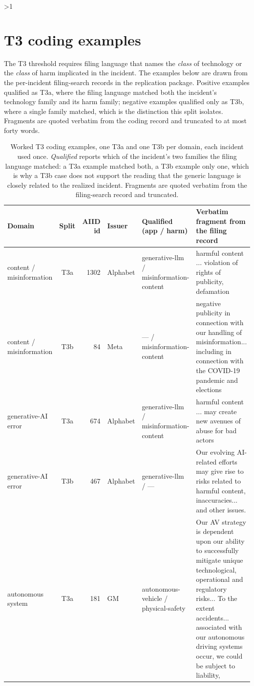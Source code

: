 \documentclass[11pt]{article}
\let\oldsection\section
\newcounter{supsec}
\renewcommand{\section}[1]{\stepcounter{supsec}\ifnum\value{supsec}>1\clearpage\fi\oldsection*{#1}}
\begin{document}
\section{T3 coding examples}
The T3 threshold requires filing language that names the \emph{class} of technology or the
\emph{class} of harm implicated in the incident. The examples below are drawn from the per-incident
filing-search records in the replication package. Positive examples qualified as T3a, where the
filing language matched both the incident's technology family and its harm family; negative examples
qualified only as T3b, where a single family matched, which is the distinction this split isolates.
Fragments are quoted verbatim from the coding record and truncated to at most forty words.

\begin{table}[H]
\caption{Worked T3 coding examples, one T3a and one T3b per domain, each incident used once. \emph{Qualified} reports which of the incident's two families the filing language matched: a T3a example matched both, a T3b example only one, which is why a T3b case does not support the reading that the generic language is closely related to the realized incident. Fragments are quoted verbatim from the filing-search record and truncated.}
\centering\scriptsize
\begin{center}
\begin{tabular}{@{}p{1.9cm}cr p{1.7cm} p{2.5cm} p{4.6cm}@{}}
\toprule
Domain & Split & AIID id & Issuer & Qualified (app / harm) & Verbatim fragment from the filing record \\ \midrule
content / misinformation & T3a & 1302 & Alphabet & generative-llm / misinformation-content & harmful content ... violation of rights of publicity, defamation \\
content / misinformation & T3b & 84 & Meta & --- / misinformation-content & negative publicity in connection with our handling of misinformation... including in connection with the COVID-19 pandemic and elections \\
generative-AI error & T3a & 674 & Alphabet & generative-llm / misinformation-content & harmful content ... may create new avenues of abuse for bad actors \\
generative-AI error & T3b & 467 & Alphabet & generative-llm / --- & Our evolving AI-related efforts may give rise to risks related to harmful content, inaccuracies... and other issues. \\
autonomous system & T3a & 181 & GM & autonomous-vehicle / physical-safety & Our AV strategy is dependent upon our ability to successfully mitigate unique technological, operational and regulatory risks... To the extent accidents... associated with our autonomous driving systems occur, we could be subject to liability, \\

\end{tabular}
\end{center}
\end{table}
\end{document}
